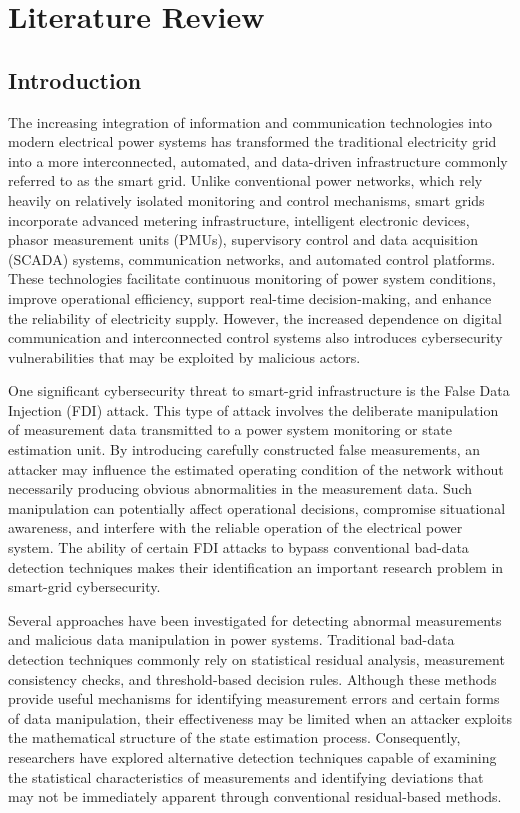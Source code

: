 \documentclass[12pt,a4paper]{report}
\begin{document}
\chapter{Literature Review}

\section{Introduction}
The increasing integration of information and communication technologies into modern
electrical power systems has transformed the traditional electricity grid into a more
interconnected, automated, and data-driven infrastructure commonly referred to as the
smart grid. Unlike conventional power networks, which rely heavily on relatively isolated
monitoring and control mechanisms, smart grids incorporate advanced metering infrastructure,
intelligent electronic devices, phasor measurement units (PMUs), supervisory control and
data acquisition (SCADA) systems, communication networks, and automated control platforms.
These technologies facilitate continuous monitoring of power system conditions, improve
operational efficiency, support real-time decision-making, and enhance the reliability of
electricity supply. However, the increased dependence on digital communication and
interconnected control systems also introduces cybersecurity vulnerabilities that may be
exploited by malicious actors.

One significant cybersecurity threat to smart-grid infrastructure is the False Data
Injection (FDI) attack. This type of attack involves the deliberate manipulation of
measurement data transmitted to a power system monitoring or state estimation unit.
By introducing carefully constructed false measurements, an attacker may influence the
estimated operating condition of the network without necessarily producing obvious
abnormalities in the measurement data. Such manipulation can potentially affect operational
decisions, compromise situational awareness, and interfere with the reliable operation
of the electrical power system. The ability of certain FDI attacks to bypass conventional
bad-data detection techniques makes their identification an important research problem
in smart-grid cybersecurity.

Several approaches have been investigated for detecting abnormal measurements and malicious
data manipulation in power systems. Traditional bad-data detection techniques commonly
rely on statistical residual analysis, measurement consistency checks, and threshold-based
decision rules. Although these methods provide useful mechanisms for identifying measurement
errors and certain forms of data manipulation, their effectiveness may be limited when an
attacker exploits the mathematical structure of the state estimation process. Consequently,
researchers have explored alternative detection techniques capable of examining the
statistical characteristics of measurements and identifying deviations that may not be
immediately apparent through conventional residual-based methods.
\end{document}
